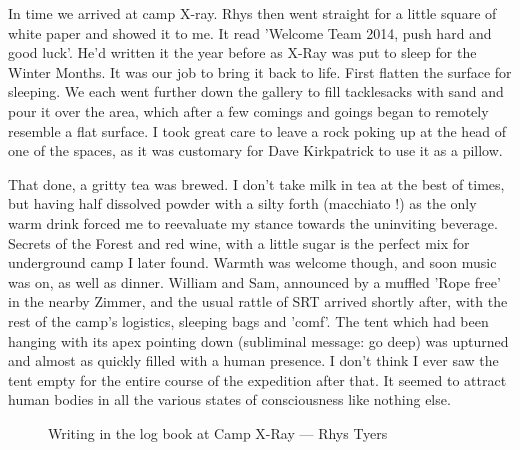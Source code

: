 In time we arrived at camp X-ray. Rhys then went straight for a little square of white paper and showed it to me. It read 'Welcome Team 2014, push hard and good luck'. He'd written it the year before as X-Ray was put to sleep for the Winter Months. It was our job to bring it back to life. First flatten the surface for sleeping. We each went  further down the gallery to fill tacklesacks with sand and pour it over the area, which after a few comings and goings began to remotely resemble a flat surface. I took great care to leave a rock poking up at the head of one of the spaces, as it was customary for Dave Kirkpatrick to use it as a pillow. 

That done, a gritty tea was brewed. I don't take milk in tea at the best of times, but having half dissolved powder with a silty forth (macchiato !) as the only warm drink forced me to reevaluate my stance towards the uninviting beverage. Secrets of the Forest and red wine, with a little sugar is the perfect mix for underground camp I later found. Warmth was welcome though, and soon music was on, as well as dinner. William and Sam, announced by a muffled 'Rope free' in the nearby Zimmer, and the usual rattle of SRT arrived shortly after, with the rest of the camp's logistics, sleeping bags and 'comf'. The tent which had been hanging with its apex pointing down (subliminal message: go deep) was upturned and almost as quickly filled with a human presence. I don't think I ever saw the tent empty for the entire course of the expedition after that. It seemed to attract human bodies in all the various states of consciousness like nothing else.

\begin{figure}[t]
\checkoddpage \ifoddpage \forcerectofloat \else \forceversofloat \fi
\centering
{}
\caption{Writing in the log book at Camp X-Ray --- Rhys Tyers}
\label{Camp X-Ray}
\end{figure}

